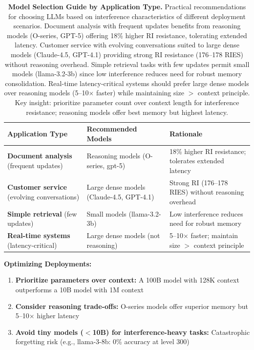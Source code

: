 \documentclass{article}
\begin{document}
\begin{table}[t]
\centering
\small
\caption{\textbf{Model Selection Guide by Application Type.}
Practical recommendations for choosing LLMs based on interference characteristics of different deployment scenarios.
Document analysis with frequent updates benefits from reasoning models (O-series, GPT-5) offering 18\% higher RI resistance, tolerating extended latency.
Customer service with evolving conversations suited to large dense models (Claude-4.5, GPT-4.1) providing strong RI resistance (176--178 RIES) without reasoning overhead.
Simple retrieval tasks with few updates permit small models (llama-3.2-3b) since low interference reduces need for robust memory consolidation.
Real-time latency-critical systems should prefer large dense models over reasoning models (5--10$\times$ faster) while maintaining size $>$ context principle.
Key insight: prioritize parameter count over context length for interference resistance; reasoning models offer best memory but highest latency.}
\setlength{\tabcolsep}{6pt}
\begin{tabular}{@{}p{4.5cm}p{5cm}p{7cm}@{}}
\toprule
Application Type & Recommended Models & Rationale \\
\midrule
\textbf{Document analysis} (frequent updates) & Reasoning models (O-series, gpt-5) & 18\% higher RI resistance; tolerates extended latency \\
\textbf{Customer service} (evolving conversations) & Large dense models (Claude-4.5, GPT-4.1) & Strong RI (176--178 RIES) without reasoning overhead \\
\textbf{Simple retrieval} (few updates) & Small models (llama-3.2-3b) & Low interference reduces need for robust memory \\
\textbf{Real-time systems} (latency-critical) & Large dense models (not reasoning) & 5--10$\times$ faster; maintain size $>$ context principle \\
\bottomrule
\end{tabular}
\end{table}

\textbf{Optimizing Deployments:}
\begin{enumerate}
    \item \textbf{Prioritize parameters over context:} A 100B model with 128K context outperforms a 10B model with 1M context
    \item \textbf{Consider reasoning trade-offs:} O-series models offer superior memory but 5--10$\times$ higher latency
    \item \textbf{Avoid tiny models ($<$10B) for interference-heavy tasks:} Catastrophic forgetting risk (e.g., llama-3-8b: 0\% accuracy at level 300)
\end{enumerate}
\end{document}
